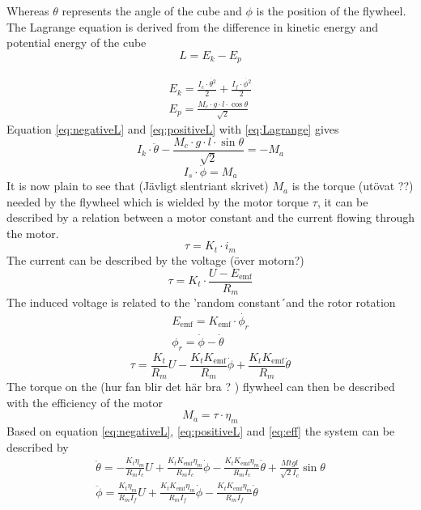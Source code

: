 \documentclass[a4paper,11pt]{kth-mag}
\begin{document}
Whereas $\theta$ represents the angle of the cube and $\phi$ is the position of the flywheel. \\
The Lagrange equation is derived from the difference in kinetic energy and potential energy of the cube
\begin{equation} \label{eq:Lagrange}
L = E_k - E_p
\end{equation}

\begin{align}
E_k = \frac{I_c \cdot \dot{\theta^2}}{2} + \frac{I_f \cdot \dot{\phi^2} }{2} \\
E_p = \frac{M_c \cdot g \cdot l \cdot \cos \theta}{\sqrt{2}} 
\end{align}
Equation \eqref{eq:negativeL} and \eqref{eq:positiveL} with \eqref{eq:Lagrange} gives
\begin{equation} \label{eq:negativeL2}
I_k \cdot \ddot{\theta} - \frac{M_c \cdot g \cdot l \cdot \sin \theta }{\sqrt{2}}  = -M_a
\end{equation}
\begin{equation} \label{eq:postiveL2}
I_s \cdot \ddot{\phi} = M_a
\end{equation}
It is now plain to see that (Jävligt slentriant skrivet) $M_a$ is the torque (utövat ??) needed by the flywheel which is wielded by the motor torque $\tau$, it can be described by a relation between a motor constant and the current flowing through the motor.
\begin{equation}
\tau = K_t \cdot i_m
\end{equation}
The current can be described by the voltage (över motorn?)
\begin{equation}
\tau = K_t \cdot \frac{U-E_{\text{emf}} }{R_m}
\end{equation}
The induced voltage is related to the 'random constant´and the rotor rotation
\begin{align}
E_{\text{emf}} = K_{\text{emf}} \cdot \dot{\phi_r} \\
\phi_r = \dot{\phi} - \dot{\theta} 
\end{align}
\begin{equation} \label{eq:tau}
\tau = \frac{K_t}{R_m} U - \frac{K_t K_{\text{emf}} }{R_m} \dot{\phi} + \frac{K_t K_{\text{emf}} }{R_m} \dot{\theta}
\end{equation}
The torque on the (hur fan blir det här bra ? ) flywheel can then be described with the efficiency of the motor
\begin{equation} \label{eq:eff}
M_a = \tau \cdot \eta_m
\end{equation}
Based on equation \eqref{eq:negativeL}, \eqref{eq:positiveL} and \eqref{eq:eff} the system can be described by
\begin{align} 
\ddot{\theta} = -\frac{K_t \eta_m}{R_m I_c} U + \frac{K_t K_{\text{emf}} \eta_m}{R_m I_c} \dot{\phi} - \frac{K_t K_{\text{emf}} \eta_m}{R_m I_c} \dot{\theta} + \frac{Mt g l }{\sqrt{2} I_c} \sin \theta \label{thetadotdot}
\\
\ddot{\phi} = \frac{K_t \eta_m}{R_m I_f} U + \frac{K_t K_{\text{emf}} \eta_m}{R_m I_f} \dot{\phi} - \frac{K_t K_{\text{emf}} \eta_m}{R_m I_f} \dot{\theta} 
\label{phidotdot}
\end{align} 
\end{document}
